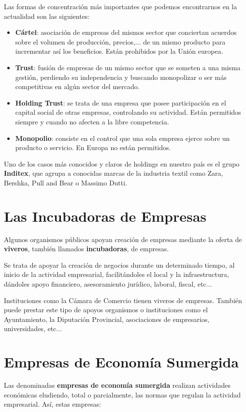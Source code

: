 Las formas de concentración más importantes que podemos encontrarnos en la actualidad son las siguientes:

\begin{itemize}
    \item \textbf{Cártel}: asociación de empresas del mismos sector que conciertan acuerdos sobre el volumen de producción, precios,... de un mismo producto para incrementar así los beneficios. Están prohibidos por la Unión europea.

    \item \textbf{Trust}: fusión de empresas de un mismo sector que se someten a una misma gestión, perdiendo su independencia y buscando monopolizar o ser más competitivas en algún sector del mercado.

    \item \textbf{Holding Trust}: se trata de una empresa que posee participación en el capital social de otras empresas, controlando su actividad. Están permitidos siempre y cuando no afecten a la libre competencia.

    \item \textbf{Monopolio}: consiste en el control que una sola empresa ejerce sobre un producto o servicio. En Europa no están permitidos.
\end{itemize}

Uno de los casos más conocidos y claros de holdings en nuestro país es el grupo \textbf{Inditex}, que agrupa a conocidas marcas de la industria textil como Zara, Bershka, Pull and Bear o Massimo Dutti.

\section{Las Incubadoras de Empresas}
Algunos organismos públicos apoyan creación de empresas mediante la oferta de \textbf{viveros}, también llamados \textbf{incubadoras}, de empresas.

Se trata de apoyar la creación de negocios durante un determinado tiempo, al inicio de la actividad empresarial, facilitándoles el local y la infraestructura, dándoles apoyo financiero, asesoramiento jurídico, laboral, fiscal, etc...

Instituciones como la Cámara de Comercio tienen viveros de empresas. También puede prestar este tipo de apoyos organismos o instituciones como el Ayuntamiento, la Diputación Provincial, asociaciones de empresarios, universidades, etc...

\section{Empresas de Economía Sumergida}
Las denominadas \textbf{empresas de economía sumergida} realizan actividades económicas eludiendo, total o parcialmente, las normas que regulan la actividad empresarial. Así, estas empresas:

